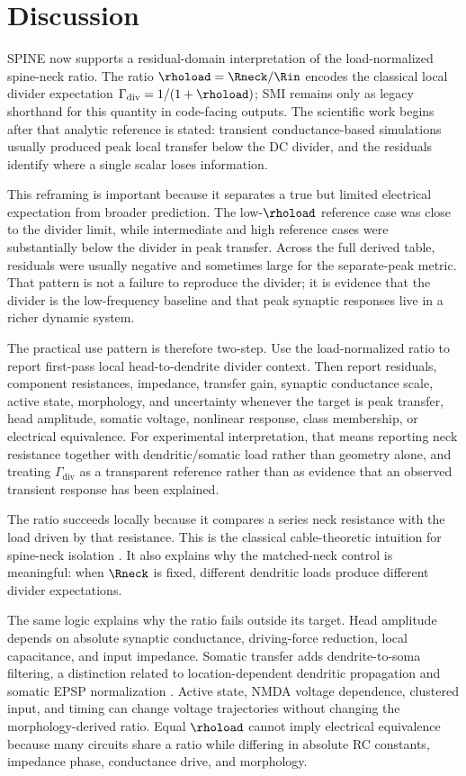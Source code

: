 \section{Discussion}

SPINE now supports a residual-domain interpretation of the load-normalized spine-neck ratio. The ratio $\rhoload=\Rneck/\Rin$ encodes the classical local divider expectation $\Gamma_{\mathrm{div}}=1/(1+\rhoload)$; SMI remains only as legacy shorthand for this quantity in code-facing outputs. The scientific work begins after that analytic reference is stated: transient conductance-based simulations usually produced peak local transfer below the DC divider, and the residuals identify where a single scalar loses information.

This reframing is important because it separates a true but limited electrical expectation from broader prediction. The low-$\rhoload$ reference case was close to the divider limit, while intermediate and high reference cases were substantially below the divider in peak transfer. Across the full derived table, residuals were usually negative and sometimes large for the separate-peak metric. That pattern is not a failure to reproduce the divider; it is evidence that the divider is the low-frequency baseline and that peak synaptic responses live in a richer dynamic system.

The practical use pattern is therefore two-step. Use the load-normalized ratio to report first-pass local head-to-dendrite divider context. Then report residuals, component resistances, impedance, transfer gain, synaptic conductance scale, active state, morphology, and uncertainty whenever the target is peak transfer, head amplitude, somatic voltage, nonlinear response, class membership, or electrical equivalence. For experimental interpretation, that means reporting neck resistance together with dendritic/somatic load rather than geometry alone, and treating $\Gamma_{\mathrm{div}}$ as a transparent reference rather than as evidence that an observed transient response has been explained.

The ratio succeeds locally because it compares a series neck resistance with the load driven by that resistance. This is the classical cable-theoretic intuition for spine-neck isolation \citep{Rall1964,SegevRall1988,Yuste2013,Magee2000Review}. It also explains why the matched-neck control is meaningful: when $\Rneck$ is fixed, different dendritic loads produce different divider expectations.

The same logic explains why the ratio fails outside its target. Head amplitude depends on absolute synaptic conductance, driving-force reduction, local capacitance, and input impedance. Somatic transfer adds dendrite-to-soma filtering, a distinction related to location-dependent dendritic propagation and somatic EPSP normalization \citep{MageeCook2000}. Active state, NMDA voltage dependence, clustered input, and timing can change voltage trajectories without changing the morphology-derived ratio. Equal $\rhoload$ cannot imply electrical equivalence because many circuits share a ratio while differing in absolute RC constants, impedance phase, conductance drive, and morphology.

